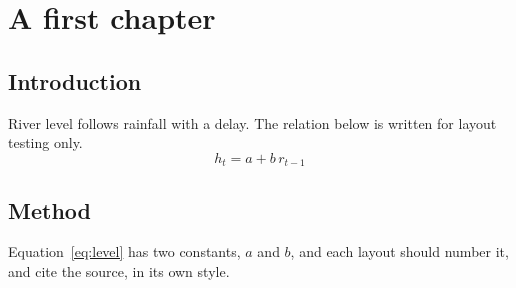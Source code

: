 \chapter{A first chapter}
\label{ch:one}
\section{Introduction}
River level follows rainfall with a delay. The relation below is written for layout testing only.
\begin{equation}
h_t = a + b\, r_{t-1}
\label{eq:level}
\end{equation}
\section{Method}
Equation~\ref{eq:level} has two constants, $a$ and $b$, and each layout should number it, and cite the source, in its own style.
